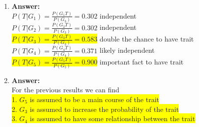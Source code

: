 \documentclass{article}
\newcommand{\myansw}{\textbf{Answer:}\\}
\begin{document}
\begin{enumerate}
\begin{enumerate}
		\item
		\myansw
		${P(T|G_1)=\frac{P(G_1T)}{P(G_3)} = 0.302}$ independent\\
		${P(T|G_2)=\frac{P(G_2T)}{P(G_3)} = 0.302}$ independent\\
		\colorbox{yellow}{${P(T|G_3)=\frac{P(G_3T)}{P(G_3)} = 0.583}$} double the chance to have trait\\
		${P(T|G_4)=\frac{P(G_4T)}{P(G_4)} = 0.371}$  likely independent\\
		\colorbox{yellow}{${P(T|G_5)=\frac{P(G_5T)}{P(G_5)} = 0.900}$} important fact to have trait\\
		
		\item
		\myansw
		For the previous results we can find\\
		\colorbox{yellow}{1. ${G_5}$ is assumed to be a main course of the trait}\\
		\colorbox{yellow}{2. ${G_3}$ is assumed to increase the probability of the trait}\\
		\colorbox{yellow}{3. ${G_4}$ is assumed to have some relationship between the trait}\\
		

\end{enumerate}
\end{enumerate}
\end{document}
